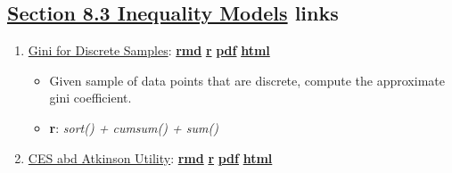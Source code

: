 \documentclass[
]{book}
\providecommand{\tightlist}{%
  \setlength{\itemsep}{0pt}\setlength{\parskip}{0pt}}
\begin{document}
\hypertarget{section-8.3-inequality-modelsinequality-models-links}{%
\subsection{\texorpdfstring{\protect\hyperlink{inequality-models}{Section 8.3 Inequality Models} links}{Section 8.3 Inequality Models links}}\label{section-8.3-inequality-modelsinequality-models-links}}

\begin{enumerate}
\def\labelenumi{\arabic{enumi}.}
\tightlist
\item
  \href{https://fanwangecon.github.io/R4Econ/math/func_ineq/htmlpdfr/fs_gini_disc.html}{Gini for Discrete Samples}: \href{https://github.com/FanWangEcon/R4Econ/blob/master/math/func_ineq//fs_gini_disc.Rmd}{\textbf{rmd}} \textbar{} \href{https://github.com/FanWangEcon/R4Econ/blob/master/math/func_ineq/htmlpdfr/fs_gini_disc.R}{\textbf{r}} \textbar{} \href{https://github.com/FanWangEcon/R4Econ/blob/master/math/func_ineq/htmlpdfr/fs_gini_disc.pdf}{\textbf{pdf}} \textbar{} \href{https://fanwangecon.github.io/R4Econ/math/func_ineq/htmlpdfr/fs_gini_disc.html}{\textbf{html}}

  \begin{itemize}
  \tightlist
  \item
    Given sample of data points that are discrete, compute the approximate gini coefficient.
  \item
    \textbf{r}: \emph{sort() + cumsum() + sum()}
  \end{itemize}
\item
  \href{https://fanwangecon.github.io/R4Econ/math/func_ineq/htmlpdfr/fs_atkinson_ces.html}{CES abd Atkinson Utility}: \href{https://github.com/FanWangEcon/R4Econ/blob/master/math/func_ineq//fs_atkinson_ces.Rmd}{\textbf{rmd}} \textbar{} \href{https://github.com/FanWangEcon/R4Econ/blob/master/math/func_ineq/htmlpdfr/fs_atkinson_ces.R}{\textbf{r}} \textbar{} \href{https://github.com/FanWangEcon/R4Econ/blob/master/math/func_ineq/htmlpdfr/fs_atkinson_ces.pdf}{\textbf{pdf}} \textbar{} \href{https://fanwangecon.github.io/R4Econ/math/func_ineq/htmlpdfr/fs_atkinson_ces.html}{\textbf{html}}


\end{enumerate}
\end{document}
